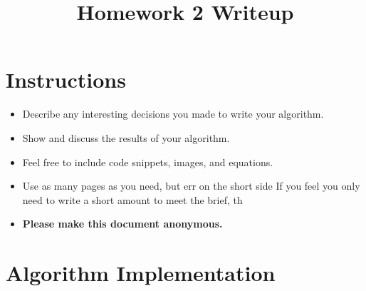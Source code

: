 \date{}

\title{\vspace{-1cm}Homework 2 Writeup}



\maketitle
\vspace{-3cm}
\thispagestyle{fancy}

\section*{Instructions}
\begin{itemize}
  \item Describe any interesting decisions you made to write your algorithm.
  \item Show and discuss the results of your algorithm.
  \item Feel free to include code snippets, images, and equations.
  \item Use as many pages as you need, but err on the short side If you feel you only need to write a short amount to meet the brief, th
  
  \item \textbf{Please make this document anonymous.}
\end{itemize}

\section*{Algorithm Implementation}

